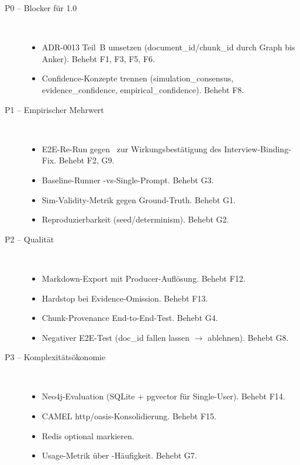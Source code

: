\begin{description}
  \item[P0 -- Blocker f{\"u}r 1.0] \mbox{}\\
    \begin{itemize}
      \item ADR-0013 Teil~B umsetzen (document\_id/chunk\_id durch Graph bis Anker). Behebt F1, F3, F5, F6.
      \item Confidence-Konzepte trennen (simulation\_consensus, evidence\_confidence, empirical\_confidence). Behebt F8.
    \end{itemize}
  \item[P1 -- Empirischer Mehrwert] \mbox{}\\
    \begin{itemize}
      \item E2E-Re-Run gegen~ zur Wirkungsbest{\"a}tigung des Interview-Binding-Fix. Behebt F2, G9.
      \item Baseline-Runner \agora{}-vs-Single-Prompt. Behebt G3.
      \item Sim-Validity-Metrik gegen Ground-Truth. Behebt G1.
      \item Reproduzierbarkeit (seed/determinism). Behebt G2.
    \end{itemize}
  \item[P2 -- Qualit{\"a}t] \mbox{}\\
    \begin{itemize}
      \item Markdown-Export mit Producer-Aufl{\"o}sung. Behebt F12.
      \item Hardstop bei Evidence-Omission. Behebt F13.
      \item Chunk-Provenance End-to-End-Test. Behebt G4.
      \item Negativer E2E-Test (doc\_id fallen lassen $\to$ ablehnen). Behebt G8.
    \end{itemize}
  \item[P3 -- Komplexit{\"a}ts{\"o}konomie] \mbox{}\\
    \begin{itemize}
      \item Neo4j-Evaluation (SQLite + pgvector f{\"u}r Single-User). Behebt F14.
      \item CAMEL http/oasis-Konsolidierung. Behebt F15.
      \item Redis optional markieren.
      \item Usage-Metrik {\"u}ber -H{\"a}ufigkeit. Behebt G7.
    \end{itemize}
\end{description}

